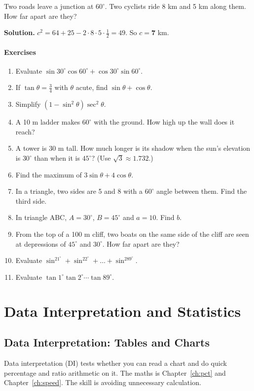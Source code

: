 \documentclass[11pt,a4paper,openany]{report}
\newenvironment{exercises}{\subsection*{Exercises \thechapter}\begin{enumerate}[label=\textbf{\thechapter.\arabic*},leftmargin=3.2em]}{\end{enumerate}}
\begin{document}
\begin{example}
Two roads leave a junction at $60^\circ$. Two cyclists ride 8 km and 5 km along them. How far apart are they?

\textbf{Solution.} $c^2=64+25-2\cdot8\cdot5\cdot\frac12=49$. So $c=\mathbf{7}$ km.
\end{example}

\begin{exercises}
\item Evaluate $\sin30^\circ\cos60^\circ+\cos30^\circ\sin60^\circ$.
\item If $\tan\theta=\frac34$ with $\theta$ acute, find $\sin\theta+\cos\theta$.
\item Simplify $(1-\sin^2\theta)\sec^2\theta$.
\item A 10 m ladder makes $60^\circ$ with the ground. How high up the wall does it reach?
\item A tower is 30 m tall. How much longer is its shadow when the sun's elevation is $30^\circ$ than when it is $45^\circ$? (Use $\sqrt3\approx1.732$.)
\item Find the maximum of $3\sin\theta+4\cos\theta$.
\item In a triangle, two sides are 5 and 8 with a $60^\circ$ angle between them. Find the third side.
\item In triangle ABC, $A=30^\circ$, $B=45^\circ$ and $a=10$. Find $b$.
\item From the top of a 100 m cliff, two boats on the same side of the cliff are seen at depressions of $45^\circ$ and $30^\circ$. How far apart are they?
\item Evaluate $\sin^21^\circ+\sin^22^\circ+\dots+\sin^289^\circ$.
\item Evaluate $\tan1^\circ\tan2^\circ\cdots\tan89^\circ$.
\end{exercises}

\part{Data Interpretation and Statistics}
\chapter{Data Interpretation: Tables and Charts}\label{ch:di}

Data interpretation (DI) tests whether you can read a chart and do quick percentage and ratio arithmetic on it. The maths is Chapter~\ref{ch:pct} and Chapter~\ref{ch:speed}. The skill is avoiding unnecessary calculation.
\end{document}
